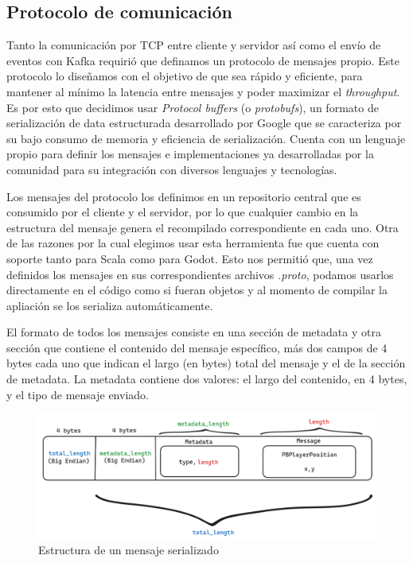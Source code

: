 \subsection{Protocolo de comunicación}

\noindent Tanto la comunicación por TCP entre cliente y servidor así como el envío de eventos con Kafka
requirió que definamos un protocolo de mensajes propio. Este protocolo lo diseñamos con el objetivo de
que sea rápido y eficiente, para mantener al mínimo la latencia entre mensajes y poder maximizar el \textit{throughput}.
Es por esto que decidimos usar \textit{Protocol buffers} (o \textit{protobufs}), un formato de serialización de data estructurada
desarrollado por Google que se caracteriza por su bajo consumo de memoria y eficiencia de serialización.
Cuenta con un lenguaje propio para definir los mensajes e implementaciones ya desarrolladas por la comunidad para su integración
con diversos lenguajes y tecnologías.

Los mensajes del protocolo los definimos en un repositorio central que es consumido por el cliente y el servidor, por lo que cualquier cambio
en la estructura del mensaje genera el recompilado correspondiente en cada uno.
Otra de las razones por la cual elegimos usar esta herramienta fue que cuenta con soporte tanto para Scala como para Godot.
Esto nos permitió que, una vez definidos los mensajes en sus correspondientes archivos \textit{.proto}, podamos usarlos
directamente en el código como si fueran objetos y al momento de compilar la apliación se los serializa automáticamente.

El formato de todos los mensajes consiste en una sección de metadata y otra sección que contiene el contenido del mensaje específico,
más dos campos de 4 bytes cada uno que indican el largo (en bytes) total del mensaje y el de la sección de metadata.
La metadata contiene dos valores: el largo del contenido, en 4 bytes, y el tipo de mensaje enviado.

\begin{figure}[htbp]
    \centering
    \includegraphics[width=1.0\textwidth]{../assets/protobuf.png}
    \caption{Estructura de un mensaje serializado}
\end{figure}


